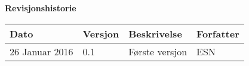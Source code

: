 
\usepackage[small,euler-digits]{eulervm}
\usepackage{color}

\usepackage{a4wide}
\usepackage[top=2cm, margin=2.5cm]{geometry}



\usepackage{graphicx}
\graphicspath{ {img/} }


\newcommand{\tuple}[1]{\ensuremath{\langle #1\rangle}}
\newcommand{\set}[1]{\ensuremath{\{#1\}}}
\newcommand{\imp}{\ensuremath{\rightarrow}}
\newcommand{\M}{\ensuremath{\mathcal{M}}}
\newcommand{\AF}{edge from parent[draw=none]}
\newcommand{\NODE}[1]{\{node \{\ensuremath{#1}\}\}}
\usepackage{textcomp}




\maketitle

\newpage
\textbf{Revisjonshistorie} \\
\begin{tabular}{|l|l|l|l|}
    \hline
    \textbf{Dato} & \textbf{Versjon} & \textbf{Beskrivelse} & \textbf{Forfatter} \\
    \hline
    26 Januar 2016 & 0.1 & Første versjon & ESN \\
    \hline
\end{tabular}
\newpage
\tableofcontents
\newpage


\newpage

\newpage

\newpage

\newpage





\newpage
\begin{appendices}
\label{appendix:script}
\end{appendices}

